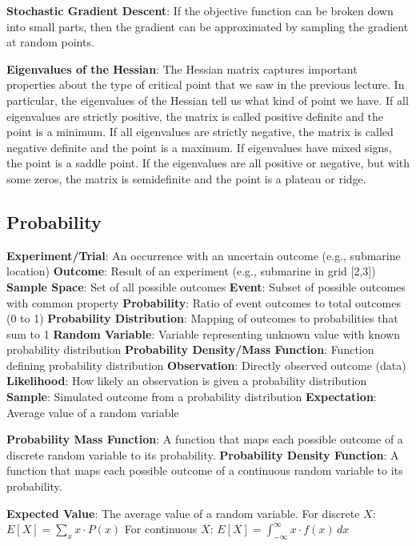 \documentclass{article}
\begin{document}
\textbf{Stochastic Gradient Descent}: If the objective function can be broken down into
small parts, then the gradient can be approximated by sampling the gradient at random points.

\textbf{Eigenvalues of the Hessian}: The Hessian matrix captures important properties about the type of critical
point that we saw in the previous lecture. In particular, the eigenvalues of the Hessian tell us what kind of point we have.
If all eigenvalues are strictly positive, the matrix is called positive definite and the point is a minimum. If all eigenvalues
are strictly negative, the matrix is called negative definite and the point is a maximum. If eigenvalues have mixed signs,
the point is a saddle point. If the eigenvalues are all positive or negative, but with some zeros, the matrix is semidefinite
and the point is a plateau or ridge.



\subsection*{Probability}
\textbf{Experiment/Trial}: An occurrence with an uncertain outcome (e.g., submarine location)
\textbf{Outcome}: Result of an experiment (e.g., submarine in grid [2,3])
\textbf{Sample Space}: Set of all possible outcomes
\textbf{Event}: Subset of possible outcomes with common property
\textbf{Probability}: Ratio of event outcomes to total outcomes (0 to 1)
\textbf{Probability Distribution}: Mapping of outcomes to probabilities that sum to 1
\textbf{Random Variable}: Variable representing unknown value with known probability distribution
\textbf{Probability Density/Mass Function}: Function defining probability distribution
\textbf{Observation}: Directly observed outcome (data)
\textbf{Likelihood}: How likely an observation is given a probability distribution
\textbf{Sample}: Simulated outcome from a probability distribution
\textbf{Expectation}: Average value of a random variable


\textbf{Probability Mass Function}: A function that maps each possible outcome of a discrete random variable to its probability.
\textbf{Probability Density Function}: A function that maps each possible outcome of a continuous random variable to its probability.


\textbf{Expected Value}: The average value of a random variable. For discrete $X$:
$ E[X] = \sum_{x} x \cdot P(x) $
For continuous $X$:
$ E[X] = \int_{-\infty}^{\infty} x \cdot f(x) \, dx $
\end{document}
